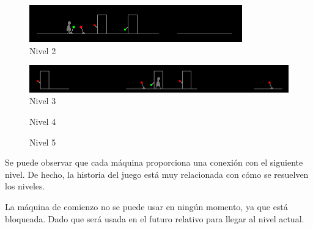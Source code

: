 \documentclass[11pt,a4paper]{article}
\begin{document}
\begin{figure}[H]
\centering
\includegraphics[scale=0.8]{l2.png}
\caption{Nivel 2}
\label{fig:level2}
\end{figure}

\begin{figure}[H]
\centering
\includegraphics[scale=0.8]{l3.png}
\caption{Nivel 3}
\label{fig:level3}
\end{figure}

\begin{figure}[H]
\centering
{}
\caption{Nivel 4}
\label{fig:level4}
\end{figure}

\begin{figure}[H]
\centering
{}
\caption{Nivel 5}
\label{fig:level5}
\end{figure}

Se puede observar que cada máquina proporciona una conexión con el siguiente 
nivel. De hecho, la historia del juego está muy relacionada con cómo se 
resuelven los niveles.

La máquina de comienzo no se puede usar en ningún momento, ya que está 
bloqueada. Dado que será usada en el futuro relativo para llegar al nivel 
actual.
\end{document}
